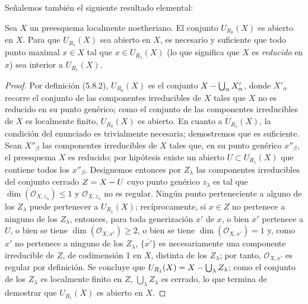Señalemos también el siguiente resultado elemental:

\begin{proposition}[6.12.10]
\label{IV.2.s6.12.10-fr}
Sea $X$ un preesquema localmente noetheriano. El conjunto $U_{R_0}(X)$ es
abierto en $X$. Para que $U_{R_1}(X)$ sea abierto en $X$, es necesario y
suficiente que todo punto maximal $x\in X$ tal que $x\in U_{R_1}(X)$ \textup{(lo
que significa que $X$ es \emph{reducido} en $x$)} sea interior a $U_{R_1}(X)$.
\end{proposition}

\begin{proof}
Por definición (5.8.2), $U_{R_0}(X)$ es el conjunto
$X-\bigcup_\alpha X'_\alpha$, donde $X'_\alpha$ recorre el conjunto de las
componentes irreducibles de $X$ tales que $X$ no es reducido en su punto
genérico; como el conjunto de las componentes irreducibles de $X$ es
localmente finito, $U_{R_0}(X)$ es abierto. En cuanto a $U_{R_1}(X)$,
la condición del enunciado es trivialmente necesaria; demostremos que es
suficiente. Sean $X''_\beta$ las componentes irreducibles de $X$ tales
que, en su punto genérico $x''_\beta$, el preesquema $X$ es reducido; por
hipótesis existe un abierto $U\subset U_{R_1}(X)$ que contiene todos los
$x''_\beta$. Designemos entonces por $Z_\lambda$ las componentes
irreducibles del conjunto cerrado $Z=X- U$ cuyo punto genérico
$z_\lambda$ es tal que $\dim(\mathcal O_{X,z_\lambda})\leq1$ y
$\mathcal O_{X,z_\lambda}$ no es regular. Ningún punto perteneciente a
alguno de los $Z_\lambda$ puede pertenecer
a $U_{R_1}(X)$; recíprocamente, si $x\in Z$ no pertenece a ninguno de los
$Z_\lambda$, entonces, para toda generización $x'$ de $x$, o bien $x'$
pertenece a $U$, o bien se tiene $\dim(\mathcal O_{X,x'})\geq2$, o bien se
tiene $\dim(\mathcal O_{X,x'})=1$ y, como $x'$ no pertenece a ninguno de
los $Z_\lambda$, $\overline{\{x'\}}$ es necesariamente una componente
irreducible de $Z$, de codimensión 1 en $X$, distinta de los
$Z_\lambda$; por tanto, $\mathcal O_{X,x'}$ es regular por definición.
Se concluye que $U_{R_1}(X)=X-\bigcup_\lambda Z_\lambda$; como el conjunto
de los $Z_\lambda$ es localmente finito en $Z$,
$\bigcup_\lambda Z_\lambda$ es cerrado, lo que termina de demostrar que
$U_{R_1}(X)$ es abierto en $X$.
\end{proof}

